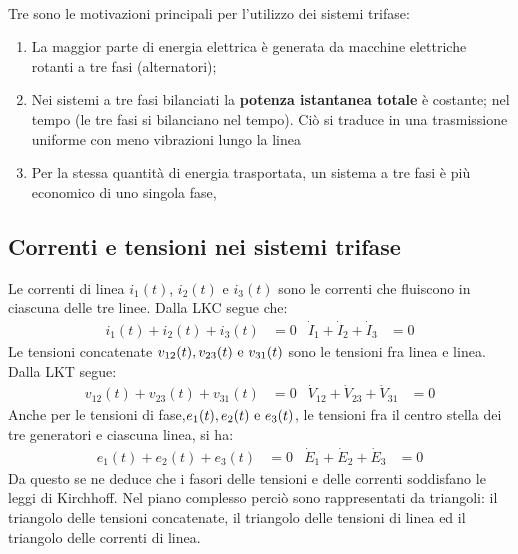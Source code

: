 \documentclass{article}
\begin{document}
\vspace*{0.2cm}\\
Tre sono le motivazioni principali per l'utilizzo dei sistemi trifase:
\begin{enumerate}
    \item La maggior parte di energia elettrica è generata da macchine elettriche rotanti a tre fasi (alternatori);
    \item Nei sistemi a tre fasi bilanciati la \textbf{potenza istantanea totale} è costante;
    nel tempo (le tre fasi si bilanciano nel tempo). Ciò si traduce in una trasmissione uniforme con meno vibrazioni lungo la linea
    \item Per la stessa quantità di energia trasportata, un sistema a tre fasi è più
    economico di uno singola fase,
\end{enumerate}



\subsection{Correnti e tensioni nei sistemi trifase}
Le correnti di linea $i_1(t)$, $i_2(t)$ e $i_3(t)$ sono le correnti che fluiscono in ciascuna delle tre linee. Dalla LKC segue che:
\begin{align*}
    i_1(t) + i_2(t)+i_3(t)&=0 & \dot I_1 + \dot I_2 + \dot I_3 &=0
\end{align*}
Le tensioni concatenate $v_{12}(t), v_{23}(t) \text{ e } v_{31}(t)$ sono le tensioni fra linea e linea. Dalla LKT segue:
\begin{align*}
    v_{12}(t) + v_{23}(t) + v_{31}(t) &= 0 & \dot V_{12} + \dot V_{23} + \dot V_{31} &= 0
\end{align*}
Anche per le tensioni di fase,$e_1 (t), e_2 (t) \text{ e } e_3(t)$, le tensioni fra il centro stella dei tre generatori e ciascuna linea, si ha:
\begin{align*}
    e_1 (t) + e_2 (t) + e_3(t) &= 0 & \dot E_1 + \dot E_2 + \dot E_3 &= 0
\end{align*}
Da questo se ne deduce che i fasori delle tensioni e delle correnti soddisfano le leggi di Kirchhoff. Nel piano complesso perciò sono rappresentati da
triangoli: il triangolo delle tensioni concatenate, il triangolo delle tensioni di linea ed il triangolo
delle correnti di linea. 
\end{document}
